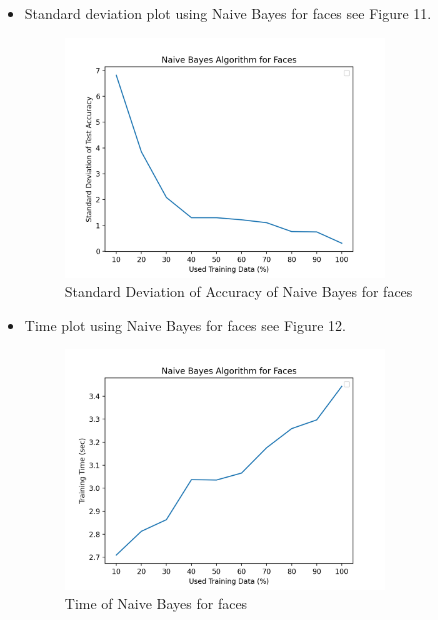 \documentclass{article}
\begin{document}
\begin{itemize}
    \item Standard deviation plot using Naive Bayes for faces see Figure 11.
    \begin{figure}
        \centering
        \includegraphics[width=0.8\textwidth]{nbFaSd.png}
        \caption{Standard Deviation of Accuracy of Naive Bayes for faces}
    \end{figure}
    
    \item Time plot using Naive Bayes for faces see Figure 12.
    \begin{figure}
        \centering
        \includegraphics[width=0.8\textwidth]{nbFaTime.png}
        \caption{Time of Naive Bayes for faces}
    \end{figure}
\end{itemize}
\end{document}
